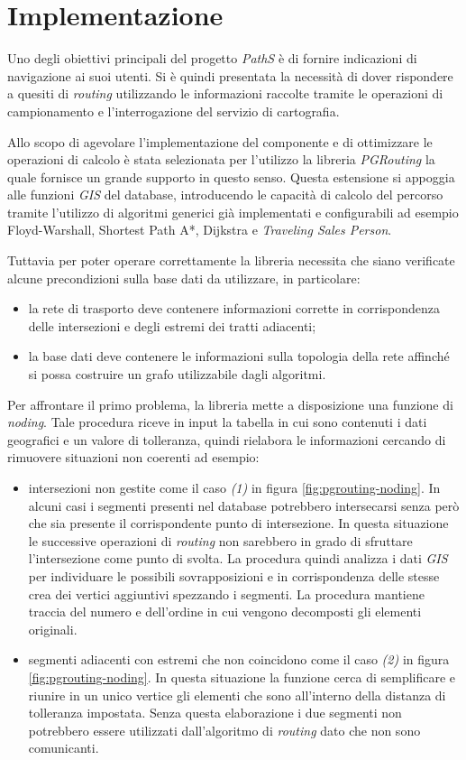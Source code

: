 \section{Implementazione}
Uno degli obiettivi principali del progetto \emph{PathS} è di fornire indicazioni di navigazione ai suoi utenti. Si è quindi presentata la necessità di dover rispondere a quesiti di \emph{routing} utilizzando le informazioni raccolte tramite le operazioni di campionamento e l'interrogazione del servizio di cartografia. 

Allo scopo di agevolare l'implementazione del componente e di ottimizzare le operazioni di calcolo è stata selezionata per l'utilizzo la libreria \emph{PGRouting} la quale fornisce un grande supporto in questo senso. Questa estensione si appoggia alle funzioni \emph{GIS} del database, introducendo le capacità di calcolo del percorso tramite l'utilizzo di algoritmi generici già implementati e configurabili ad esempio Floyd-Warshall, Shortest Path A*, Dijkstra e \emph{Traveling Sales Person}.

Tuttavia per poter operare correttamente la libreria necessita che siano verificate alcune precondizioni sulla base dati da utilizzare, in particolare:
\begin{itemize}
	\item la rete di trasporto deve contenere informazioni corrette in corrispondenza delle intersezioni e degli estremi dei tratti adiacenti;
	\item la base dati deve contenere le informazioni sulla topologia della rete affinché si possa costruire un grafo utilizzabile dagli algoritmi.
\end{itemize}

Per affrontare il primo problema, la libreria mette a disposizione una funzione di \emph{noding}. Tale procedura riceve in input la tabella in cui sono contenuti i dati geografici e un valore di tolleranza, quindi rielabora le informazioni cercando di rimuovere situazioni non coerenti ad esempio:
\begin{itemize}
 \item intersezioni non gestite come il caso \emph{(1)} in figura \ref{fig:pgrouting-noding}. In alcuni casi i segmenti presenti nel database potrebbero intersecarsi senza però che sia presente il corrispondente punto di intersezione. In questa situazione le successive operazioni di \emph{routing} non sarebbero in grado di sfruttare l'intersezione come punto di svolta. La procedura quindi analizza i dati \emph{GIS} per individuare le possibili sovrapposizioni e in corrispondenza delle stesse crea dei vertici aggiuntivi spezzando i segmenti. La procedura mantiene traccia del numero e dell'ordine in cui vengono decomposti gli elementi originali.
 \item segmenti adiacenti con estremi che non coincidono come il caso \emph{(2)} in figura \ref{fig:pgrouting-noding}. In questa situazione la funzione cerca di semplificare e riunire in un unico vertice gli elementi che sono all'interno della distanza di tolleranza impostata. Senza questa elaborazione i due segmenti non potrebbero essere utilizzati dall'algoritmo di \emph{routing} dato che non sono comunicanti.
\end{itemize}


